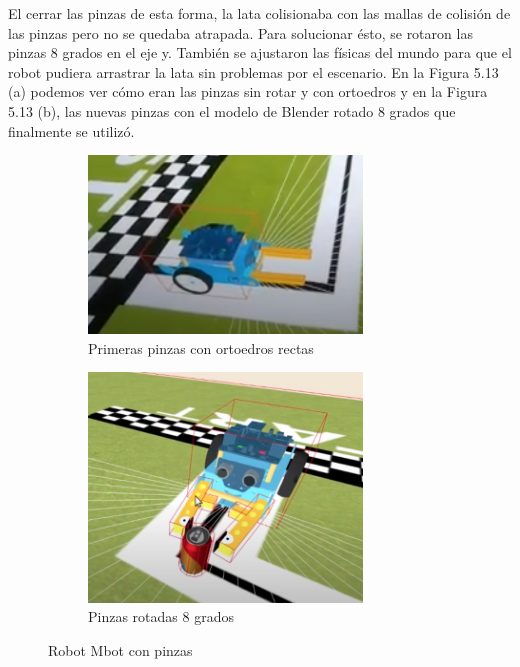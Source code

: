 El cerrar las pinzas de esta forma,  la lata colisionaba con las mallas de colisión de las pinzas pero no se quedaba atrapada. Para solucionar ésto, se rotaron las pinzas 8 grados en el eje y. También se ajustaron las físicas del mundo para que el robot pudiera arrastrar la lata sin problemas por el escenario. En la Figura 5.13 (a) podemos ver cómo eran las pinzas sin rotar y con ortoedros y en la Figura 5.13 (b), las nuevas pinzas con el modelo de Blender rotado 8 grados que finalmente se utilizó.


\begin{figure}[H]
  \begin{subfigure}[b]{0.5\textwidth}
  \centering
    \includegraphics[width=0.8\textwidth, height=0.5\textwidth]{chapters/images/pinzarecta.png}
    \caption{Primeras pinzas con ortoedros rectas}
    \label{fig:f1}
  \end{subfigure}
  \hfill
  \begin{subfigure}[b]{0.5\textwidth}
  \centering
    \includegraphics[width=0.8\textwidth, height=0.5\textwidth]{chapters/images/pinzaok.png}
	\caption{Pinzas rotadas 8 grados}    
    \label{fig:f2}
 
  \end{subfigure}
  \caption{Robot Mbot con pinzas}
\end{figure}

